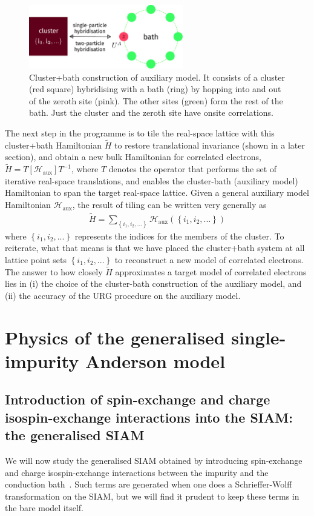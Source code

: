 \documentclass{report}
\numberwithin{equation}{section}
\begin{document}
\begin{figure}[!htb]
 	\centering
 	\includegraphics[width=0.6\textwidth]{../figures/gen_siam.pdf}
 	\caption{Cluster+bath construction of auxiliary model. It consists of a cluster (red square) hybridising with a bath (ring) by hopping into and out of the zeroth site (pink). The other sites (green) form the rest of the bath. Just the cluster and the zeroth site have onsite correlations.}
 \end{figure}
 The next step in the programme is to tile the real-space lattice with this cluster+bath Hamiltonian \(\tilde H\) to restore translational invariance (shown in a later section), and obtain a new bulk Hamiltonian for correlated electrons, $\tilde H = T\left[ \mathcal{H}_\text{aux} \right] T^{-1}$, where $T$ denotes the operator that performs the set of iterative real-space translations, and enables the cluster-bath (auxiliary model) Hamiltonian to span the target real-space lattice. Given a general auxiliary model Hamiltonian \(\mathcal{H}_\text{aux}\), the result of tiling can be written very generally as
 \begin{equation}\begin{aligned}
	 \tilde H = \sum_{\left\{i_1,i_2,...\right\}} \mathcal{H}_\text{aux}\left(\left\{i_1,i_2,...\right\}\right)
 \end{aligned}\end{equation}
where \(\left\{i_1,i_2,...\right\}\) represents the indices for the members of the cluster. To reiterate, what that means is that we have placed the cluster+bath system at all lattice point sets \(\left\{i_1,i_2,...\right\}\) to reconstruct a new model of correlated electrons. The answer to how closely $\tilde H$ approximates a target model of correlated electrons lies in (i) the choice of the cluster-bath construction of the auxiliary model, and (ii) the accuracy of the URG procedure on the auxiliary model. 

\chapter{Physics of the generalised single-impurity Anderson model}
\label{chap:urg1}
\section{Introduction of spin-exchange and charge isospin-exchange interactions into the SIAM: the generalised SIAM}
We will now study the generalised SIAM obtained by introducing spin-exchange and charge isospin-exchange interactions between the impurity and the conduction bath~\cite{zitko_2006}. Such terms are generated when one does a Schrieffer-Wolff transformation on the SIAM, but we will find it prudent to keep these terms in the bare model itself.
\end{document}
